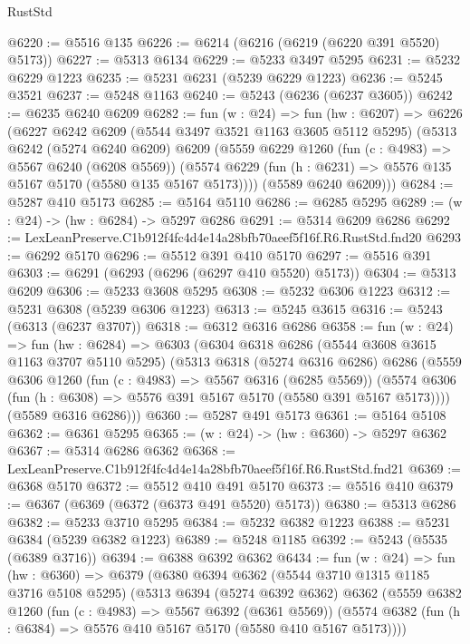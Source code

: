 \begin{lexlean}{RustStd}
\begin{coremodule}
@6220 := @5516 @135
@6226 := @6214 (@6216 (@6219 (@6220 @391 @5520) @5173))
@6227 := @5313 @6134
@6229 := @5233 @3497 @5295
@6231 := @5232 @6229 @1223
@6235 := @5231 @6231 (@5239 @6229 @1223)
@6236 := @5245 @3521
@6237 := @5248 @1163
@6240 := @5243 (@6236 (@6237 @3605))
@6242 := @6235 @6240 @6209
@6282 := fun (w : @24) =>
  fun (hw : @6207) =>
  @6226
    (@6227
      @6242
      @6209
      (@5544 @3497 @3521 @1163 @3605 @5112 @5295)
      (@5313
        @6242
        (@5274 @6240 @6209)
        @6209
        (@5559
          @6229
          @1260
          (fun (c : @4983) => @5567 @6240 (@6208 @5569))
          (@5574 @6229 (fun (h : @6231) => @5576 @135 @5167 @5170 (@5580 @135 @5167 @5173))))
        (@5589 @6240 @6209)))
@6284 := @5287 @410 @5173
@6285 := @5164 @5110
@6286 := @6285 @5295
@6289 := (w : @24) -> (hw : @6284) -> @5297 @6286
@6291 := @5314 @6209 @6286
@6292 := LexLeanPreserve.C1b912f4fc4d4e14a28bfb70aeef5f16f.R6.RustStd.fnd20
@6293 := @6292 @5170
@6296 := @5512 @391 @410 @5170
@6297 := @5516 @391
@6303 := @6291 (@6293 (@6296 (@6297 @410 @5520) @5173))
@6304 := @5313 @6209
@6306 := @5233 @3608 @5295
@6308 := @5232 @6306 @1223
@6312 := @5231 @6308 (@5239 @6306 @1223)
@6313 := @5245 @3615
@6316 := @5243 (@6313 (@6237 @3707))
@6318 := @6312 @6316 @6286
@6358 := fun (w : @24) =>
  fun (hw : @6284) =>
  @6303
    (@6304
      @6318
      @6286
      (@5544 @3608 @3615 @1163 @3707 @5110 @5295)
      (@5313
        @6318
        (@5274 @6316 @6286)
        @6286
        (@5559
          @6306
          @1260
          (fun (c : @4983) => @5567 @6316 (@6285 @5569))
          (@5574 @6306 (fun (h : @6308) => @5576 @391 @5167 @5170 (@5580 @391 @5167 @5173))))
        (@5589 @6316 @6286)))
@6360 := @5287 @491 @5173
@6361 := @5164 @5108
@6362 := @6361 @5295
@6365 := (w : @24) -> (hw : @6360) -> @5297 @6362
@6367 := @5314 @6286 @6362
@6368 := LexLeanPreserve.C1b912f4fc4d4e14a28bfb70aeef5f16f.R6.RustStd.fnd21
@6369 := @6368 @5170
@6372 := @5512 @410 @491 @5170
@6373 := @5516 @410
@6379 := @6367 (@6369 (@6372 (@6373 @491 @5520) @5173))
@6380 := @5313 @6286
@6382 := @5233 @3710 @5295
@6384 := @5232 @6382 @1223
@6388 := @5231 @6384 (@5239 @6382 @1223)
@6389 := @5248 @1185
@6392 := @5243 (@5535 (@6389 @3716))
@6394 := @6388 @6392 @6362
@6434 := fun (w : @24) =>
  fun (hw : @6360) =>
  @6379
    (@6380
      @6394
      @6362
      (@5544 @3710 @1315 @1185 @3716 @5108 @5295)
      (@5313
        @6394
        (@5274 @6392 @6362)
        @6362
        (@5559
          @6382
          @1260
          (fun (c : @4983) => @5567 @6392 (@6361 @5569))
          (@5574 @6382 (fun (h : @6384) => @5576 @410 @5167 @5170 (@5580 @410 @5167 @5173))))

\end{coremodule}
\end{lexlean}
